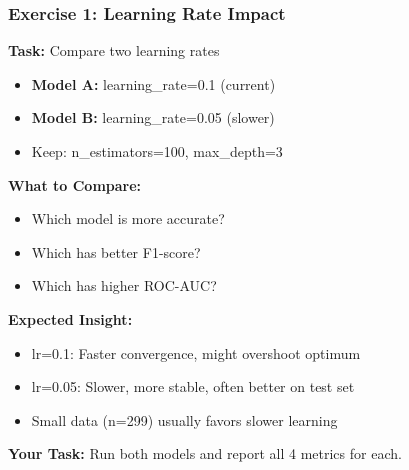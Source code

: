 \documentclass{beamer}
\begin{document}
\begin{frame}[fragile]
\frametitle{Exercise 1: Learning Rate Impact}

\textbf{Task:} Compare two learning rates

\begin{itemize}
    \item \textbf{Model A:} learning\_rate=0.1 (current)
    \item \textbf{Model B:} learning\_rate=0.05 (slower)
    \item Keep: n\_estimators=100, max\_depth=3
\end{itemize}

\vspace{0.3cm}
\textbf{What to Compare:}

\begin{itemize}
    \item Which model is more accurate?
    \item Which has better F1-score?
    \item Which has higher ROC-AUC?
\end{itemize}

\vspace{0.3cm}
\textbf{Expected Insight:}

\begin{itemize}
    \item lr=0.1: Faster convergence, might overshoot optimum
    \item lr=0.05: Slower, more stable, often better on test set
    \item Small data (n=299) usually favors slower learning
\end{itemize}

\vspace{0.2cm}
\textbf{Your Task:} Run both models and report all 4 metrics for each.

\end{frame}
\end{document}
